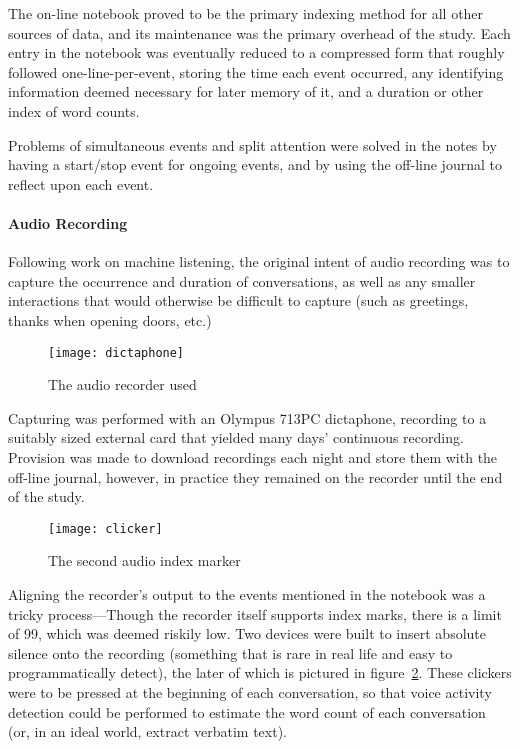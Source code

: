 The on-line notebook proved to be the primary indexing method for all other sources of data, and its maintenance was the primary overhead of the study.  Each entry in the notebook was eventually reduced to a compressed form that roughly followed one-line-per-event, storing the time each event occurred, any identifying information deemed necessary for later memory of it, and a duration or other index of word counts.


Problems of simultaneous events and split attention were solved in the notes by having a start/stop event for ongoing events, and by using the off-line journal to reflect upon each event.


\paragraph{Audio Recording}
Following work on machine listening, the original intent of audio recording was to capture the occurrence and duration of conversations, as well as any smaller interactions that would otherwise be difficult to capture (such as greetings, thanks when opening doors, etc.)


\begin{figure}[p]
\centering
\texttt{[image: dictaphone]}
\caption{The audio recorder used}
\label{fig:personal:audiorecorder}
\end{figure}



Capturing was performed with an Olympus 713PC dictaphone, recording to a suitably sized external card that yielded many days' continuous recording.  Provision was made to download recordings each night and store them with the off-line journal, however, in practice they remained on the recorder until the end of the study.


\begin{figure}[p]
\centering
\texttt{[image: clicker]}
\caption{The second audio index marker}
\label{fig:personal:clicker}
\end{figure}


Aligning the recorder's output to the events mentioned in the notebook was a tricky process---Though the recorder itself supports index marks, there is a limit of 99, which was deemed riskily low.  Two devices were built to insert absolute silence onto the recording (something that is rare in real life and easy to programmatically detect), the later of which is pictured in figure~\ref{fig:personal:clicker}.  These clickers were to be pressed at the beginning of each conversation, so that voice activity detection could be performed to estimate the word count of each conversation (or, in an ideal world, extract verbatim text).

